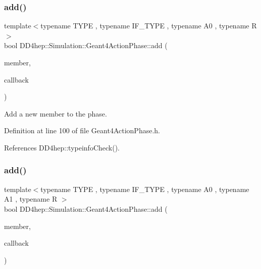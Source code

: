 \subsubsection{\texorpdfstring{add()}{add()}\hspace{0.1cm}{\footnotesize\ttfamily [2/4]}}
{\footnotesize\ttfamily template$<$typename T\+Y\+PE , typename I\+F\+\_\+\+T\+Y\+PE , typename A0 , typename R $>$ \\
bool D\+D4hep\+::\+Simulation\+::\+Geant4\+Action\+Phase\+::add (\begin{DoxyParamCaption}\item[{T\+Y\+PE $\ast$}]{member,  }\item[{R(I\+F\+\_\+\+T\+Y\+P\+E\+::$\ast$)(A0 arg)}]{callback }\end{DoxyParamCaption})\hspace{0.3cm}{\ttfamily [inline]}}



Add a new member to the phase. 



Definition at line 100 of file Geant4\+Action\+Phase.\+h.



References D\+D4hep\+::typeinfo\+Check().

\hypertarget{class_d_d4hep_1_1_simulation_1_1_geant4_action_phase_a0a10762619fbba6996d9ac17f6141f8c}{}\label{class_d_d4hep_1_1_simulation_1_1_geant4_action_phase_a0a10762619fbba6996d9ac17f6141f8c} 
\subsubsection{\texorpdfstring{add()}{add()}\hspace{0.1cm}{\footnotesize\ttfamily [3/4]}}
{\footnotesize\ttfamily template$<$typename T\+Y\+PE , typename I\+F\+\_\+\+T\+Y\+PE , typename A0 , typename A1 , typename R $>$ \\
bool D\+D4hep\+::\+Simulation\+::\+Geant4\+Action\+Phase\+::add (\begin{DoxyParamCaption}\item[{T\+Y\+PE $\ast$}]{member,  }\item[{R(I\+F\+\_\+\+T\+Y\+P\+E\+::$\ast$)(A0 arg0, A1 arg1)}]{callback }\end{DoxyParamCaption})\hspace{0.3cm}{\ttfamily [inline]}}



